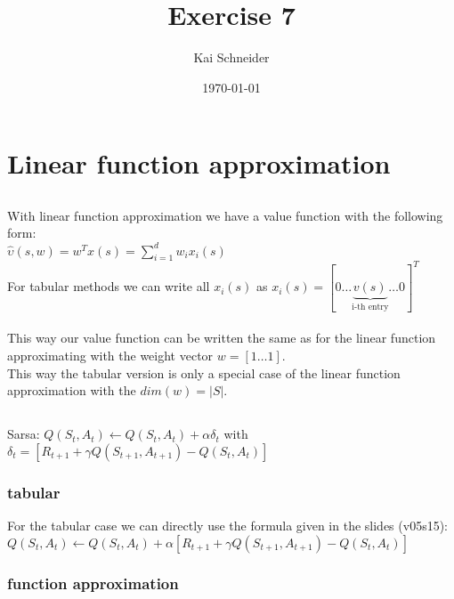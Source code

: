 \documentclass[11pt,a4paper]{article}
\title{Exercise 7}
\author{Kai Schneider}
\date{\today}
\begin{document}
 

\maketitle

\section{Linear function approximation}

\subsection{}

With linear function approximation we have a value function with the following form:\\
$ \hat{\upsilon}(s,w)=w^{T}x(s)=\sum_{i=1}^{d}w_{i}x_{i}(s)$\\
For tabular methods we can write all $x_{i}(s)$ as 
$x_{i}(s)=[0 \dots \underbrace{v(s)}_{\text{i-th entry}}\dots 0]^T$\\\\
This way our value function can be written the same as for the linear function 
approximating with the weight vector $w = [1 \dots 1]$.\\
This way the tabular version is only a special case of the linear function 
approximation with the $dim(w)=|S|$.

\subsection{}

Sarsa: $Q(S_t,A_t) \leftarrow Q(S_t,A_t) + \alpha \delta_{t}$ with  
$\delta_{t}=[R_{t+1}+\gamma Q(S_{t+1},A_{t+1})-Q(S_t,A_t)]$

\subsubsection{tabular}

For the tabular case we can directly use the formula given in the slides (v05s15):
\vspace{10pt}
\flushleft
$Q(S_t,A_t) \leftarrow Q(S_t,A_t) + \alpha [R_{t+1}+\gamma Q(S_{t+1},A_{t+1})-Q(S_t,A_t)]$

\subsubsection{function approximation}
\end{document}
